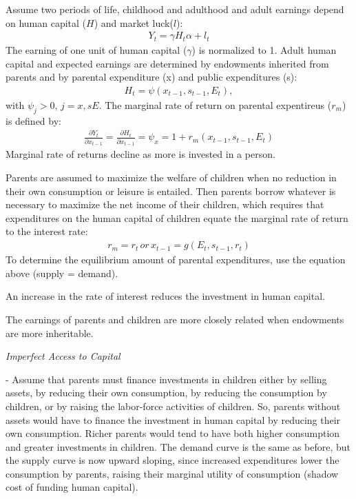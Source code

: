 \documentclass[11pt]{article}
\newcommand{\deldel}[2]{ \frac{ \partial #1}{\partial #2}}  %
\begin{document}
Assume two periods of life, childhood and adulthood and adult earnings depend on human capital ($H$) and market luck($l$):
\begin{align}
Y_t = \gamma H_t \alpha + l_t
\end{align}
The earning of one unit of human capital ($\gamma$) is normalized to 1. Adult human capital and expected earnings are determined by endowments inherited from parents and by parental expenditure (x) and public expenditures (s):
\begin{align}
H_t = \psi(x_{t-1}, s_{t-1}, E_t),
\end{align}
with $\psi_j >0,\, j = x,sE.$
The marginal rate of return on parental expentireus ($r_m$) is defined by:
\begin{align}
\deldel{Y_t}{x_{t-1}} = \deldel{H_t}{x_{t-1}} = \psi_x = 1 + r_m(x_{t-1}, s_{t-1}, E_t)
\end{align}
Marginal rate of returns decline as more is invested in a person. 

Parents are assumed to maximize the welfare of children when no reduction in their own consumption or leisure is entailed. Then parents borrow whatever is necessary to maximize the net income of their children, which requires that expenditures on the human capital of children equate the marginal rate of return to the interest rate:
\begin{align}
r_m = r_t \, or \, \hat{x}_{t-1} = g(E_t,s_{t-1},r_t)
\end{align}
To determine the equilibrium amount of parental expenditures, use the equation above (supply = demand). 

An increase in the rate of interest reduces the investment in human capital. 

The earnings of parents and children are more closely related when endowments are more inheritable. 

\indent \emph{Imperfect Access to Capital}

- Assume that parents must finance investments in children either by selling assets, by reducing their own consumption, by reducing the consumption by children, or by raising the labor-force activities of children. So, parents without assets would have to finance the investment in human capital by reducing their own consumption. Richer parents would tend to have both higher consumption and greater investments in children. The demand curve is the same as before, but the supply curve is now upward sloping, since increased expenditures lower the consumption by parents, raising their marginal utility of consumption (shadow cost of funding human capital). 
\end{document}
